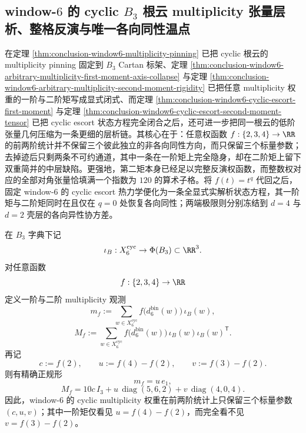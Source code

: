 \subsection{window-\texorpdfstring{$6$}{6} 的 cyclic \texorpdfstring{$B_3$}{B3} 根云 multiplicity 张量层析、整格反演与唯一各向同性温点}\label{subsec:conclusion-window6-cyclic-b3-rootcloud-multiplicity-tomography}

在定理 \ref{thm:conclusion-window6-multiplicity-pinning} 已把 cyclic 根云的 multiplicity pinning 固定到 \(B_3\) Cartan 标架、定理 \ref{thm:conclusion-window6-arbitrary-multiplicity-first-moment-axis-collapse} 与定理 \ref{thm:conclusion-window6-arbitrary-multiplicity-second-moment-rigidity} 已把任意 multiplicity 权重的一阶与二阶矩写成显式闭式、而定理 \ref{thm:conclusion-window6-cyclic-escort-first-moment} 与定理 \ref{thm:conclusion-window6-cyclic-escort-second-moment-tensor} 已把 cyclic escort 状态方程完全闭合之后，还可进一步把同一根云的低阶张量几何压缩为一条更细的层析链。其核心在于：任意权函数 \(f:\{2,3,4\}\to\RR\) 的前两阶统计并不保留三个彼此独立的非各向同性方向，而只保留三个标量参数；去掉迹后只剩两条不可约通道，其中一条在一阶矩上完全隐身，却在二阶矩上留下双重简并的中层缺陷。更强地，第二矩本身已经足以完整反演权函数，而整数权对应的全部对角张量恰填满一个指数为 \(120\) 的算术子格。将 \(f(t)=t^q\) 代回之后，固定 window-\(6\) 的 cyclic escort 热力学便化为一条全显式实解析状态方程，其一阶矩与二阶矩同时在且仅在 \(q=0\) 处恢复各向同性；两端极限则分别冻结到 \(d=4\) 与 \(d=2\) 壳层的各向异性协方差。

\begin{theorem}\label{thm:conclusion-window6-cyclic-multiplicity-threeparameter-normalform}
在 \(B_3\) 字典下记
\[
\iota_B:X_6^{\mathrm{cyc}}\to \Phi(B_3)\subset\RR^3.
\]
对任意函数
\[
f:\{2,3,4\}\to\RR
\]
定义一阶与二阶 multiplicity 观测
\[
m_f:=
\sum_{w\in X_6^{\mathrm{cyc}}}
f\!\bigl(d_6^{\mathrm{bin}}(w)\bigr)\,\iota_B(w),
\]
\[
M_f:=
\sum_{w\in X_6^{\mathrm{cyc}}}
f\!\bigl(d_6^{\mathrm{bin}}(w)\bigr)\,
\iota_B(w)\iota_B(w)^{\mathsf T}.
\]
再记
\[
c:=f(2),\qquad
u:=f(4)-f(2),\qquad
v:=f(3)-f(2).
\]
则有精确正规形
\[
m_f=u\,e_1,
\]
\[
M_f
=
10c\,I_3
+u\,\operatorname{diag}(5,6,2)
+v\,\operatorname{diag}(4,0,4).
\]
因此，window-\(6\) 的 cyclic multiplicity 权重在前两阶统计上只保留三个标量参数 \((c,u,v)\)；其中一阶矩仅看见 \(u=f(4)-f(2)\)，而完全看不见 \(v=f(3)-f(2)\)。
\end{theorem}

